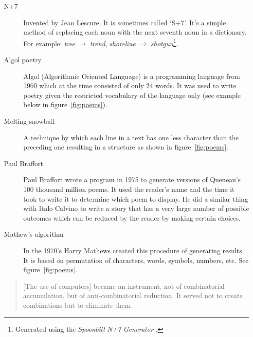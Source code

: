 \begin{description}
  \item[N+7] Invented by Jean Lescure. It is sometimes called `S+7'. It's a simple method of replacing each noun with the next seventh noun in a dictionary. For example: \textit{tree} $\rightarrow$ \textit{trend}, \textit{shoreline} $\rightarrow$ \textit{shotgun}\footnote{Generated using the \textit{Spoonbill N+7 Generator} \autocite{Christian2016}.}.
  \item[Algol poetry] Algol (Algorithmic Oriented Language) is a programming language from 1960 which at the time consisted of only 24 words. It was used to write poetry given the restricted vocabulary of the language only (see example below in figure~\ref{fig:poems}).
  \item[Melting snowball] A technique by which each line in a text has one less character than the preceding one resulting in a structure as shown in figure~\ref{fig:poems}.
  \item[Paul Braffort] Paul Braffort wrote a program in 1975 to generate versions of Queneau's \num{100} thousand million poems. It used the reader's name and the time it took to write it to determine which poem to display. He did a similar thing with Italo Calvino to write a story that has a very large number of possible outcomes which can be reduced by the reader by making certain choices.
  \item[Mathew's algorithm] In the 1970's Harry Mathews created this procedure of generating results. It is based on permutation of characters, words, symbols, numbers, etc. See figure~\ref{fig:poems}.
\end{description}

\begin{quotation}
  [The use of computers] became an instrument, not of combinatorial accumulation, but of anti-combinatorial reduction. It served not to create combinations but to eliminate them.
\end{quotation}

